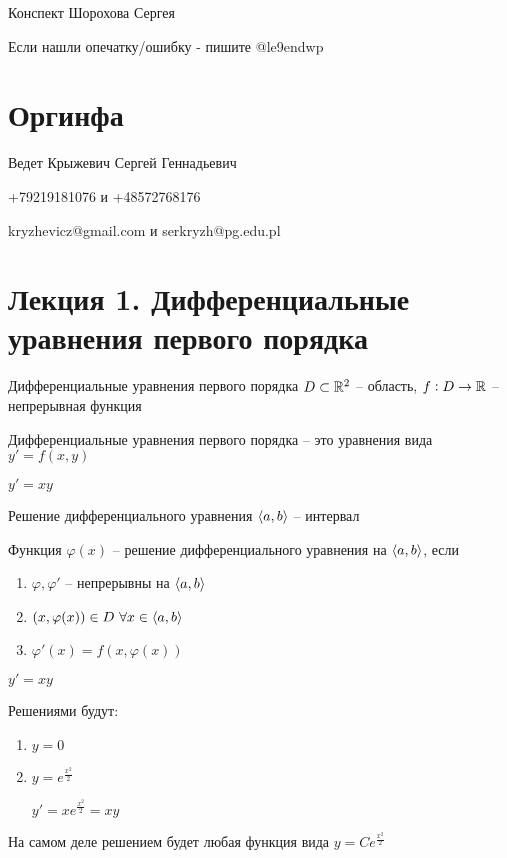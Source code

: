 \documentclass[12pt]{article}
\begin{document}
\begin{flushright}
    Конспект Шорохова Сергея

    Если нашли опечатку/ошибку - пишите @le9endwp 
\end{flushright}

\tableofcontents
\newpage

\section{Оргинфа}

Ведет Крыжевич Сергей Геннадьевич

+79219181076 и +48572768176

kryzhevicz@gmail.com и serkryzh@pg.edu.pl

\newpage

\section{Лекция 1. Дифференциальные уравнения первого порядка}

\begin{defin}{Дифференциальные уравнения первого порядка}
    $D \subset \mathbb R^2$ -- область, $f : D \to \mathbb R$ -- непрерывная функция

    Дифференциальные уравнения первого порядка -- это уравнения вида $y' = f(x, y)$
\end{defin}

\begin{Example}{}
    $y' = xy$
\end{Example}

\begin{defin}{Решение дифференциального уравнения}
    $\langle a, b \rangle$ -- интервал

    Функция $\varphi(x)$ -- решение дифференциального уравнения на $\langle a, b \rangle$, если 

    \begin{enumerate}
        \item $\varphi, \varphi'$ -- непрерывны на $\langle a, b \rangle$
        \item $(x, \varphi(x)) \in D\ \forall x \in \langle a, b \rangle$
        \item $\varphi'(x) = f(x, \varphi(x))$
    \end{enumerate}
\end{defin}

\begin{Example}{}
    $y' = xy$

    Решениями будут:

    \begin{enumerate}
        \item $y = 0$
        \item $y = e^{\frac{x^2}{2}}$
        
        $y' = xe^{\frac{x^2}{2}} = xy$
    \end{enumerate}

    На самом деле решением будет любая функция вида $y = Ce^{\frac{x^2}{2}}$
\end{Example}
\end{document}
